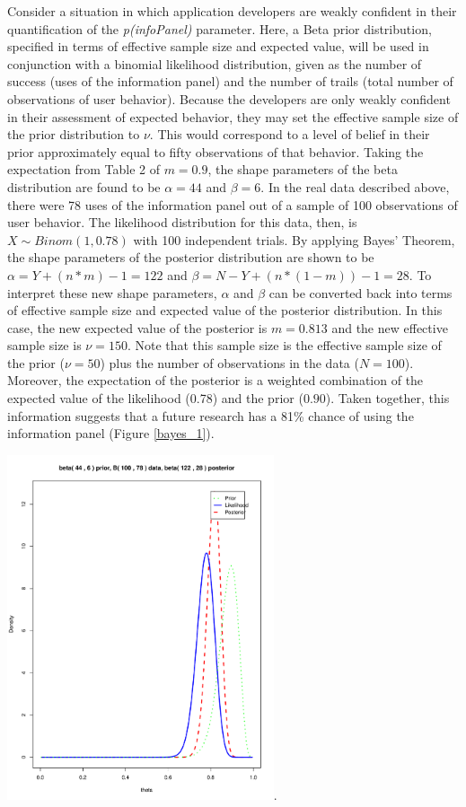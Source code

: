 \documentclass[]{article}
\begin{document}
Consider a situation in which application developers are weakly
confident in their quantification of the \emph{p(infoPanel)} parameter.
Here, a Beta prior distribution, specified in terms of effective sample
size and expected value, will be used in conjunction with a binomial
likelihood distribution, given as the number of success (uses of the
information panel) and the number of trails (total number of
observations of user behavior). Because the developers are only weakly
confident in their assessment of expected behavior, they may set the
effective sample size of the prior distribution to \(\nu\). This would
correspond to a level of belief in their prior approximately equal to
fifty observations of that behavior. Taking the expectation from Table 2
of \(m=0.9\), the shape parameters of the beta distribution are found to
be \(\alpha=44\) and \(\beta=6\). In the real data described above,
there were 78 uses of the information panel out of a sample of 100
observations of user behavior. The likelihood distribution for this
data, then, is \(X \sim Binom(1, 0.78)\) with 100 independent trials. By
applying Bayes' Theorem, the shape parameters of the posterior
distribution are shown to be \(\alpha = Y + (n*m) - 1 = 122\) and
\(\beta= N - Y + (n*(1-m)) - 1 = 28\). To interpret these new shape
parameters, \(\alpha\) and \(\beta\) can be converted back into terms of
effective sample size and expected value of the posterior distribution.
In this case, the new expected value of the posterior is \(m=0.813\) and
the new effective sample size is \(\nu=150\). Note that this sample size
is the effective sample size of the prior (\(\nu=50\)) plus the number
of observations in the data (\(N=100\)). Moreover, the expectation of
the posterior is a weighted combination of the expected value of the
likelihood (0.78) and the prior (\(0.90\)). Taken together, this
information suggests that a future research has a 81\% chance of using
the information panel (Figure \ref{bayes_1}).

\includegraphics[height=4.00000in]{./weak_posterior.pdf}.
\end{document}
